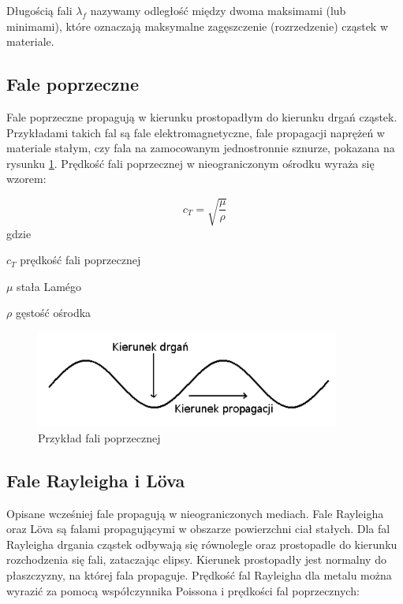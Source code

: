 Długością fali \( \lambda_f \) nazywamy odległość między dwoma maksimami (lub minimami), które oznaczają maksymalne zagęszczenie (rozrzedzenie) cząstek w materiale.

\subsection{Fale poprzeczne}

Fale poprzeczne propagują w kierunku prostopadłym do kierunku drgań cząstek. Przykładami takich fal są fale elektromagnetyczne, fale propagacji naprężeń w materiale stałym, czy fala na zamocowanym jednostronnie sznurze, pokazana na rysunku \ref{fig:fala_poprzeczna}. Prędkość fali poprzecznej w nieograniczonym ośrodku wyraża się wzorem:

\begin{equation}
c_T=\sqrt{\frac{\mu}{\rho}}
\end{equation}
gdzie
\begin{eqwhere}[2cm]
        \item[$c_T$] prędkość fali poprzecznej
        \item[$\mu$] stała Lam\'{e}go
        \item[$\rho$] gęstość ośrodka
\end{eqwhere}

\begin{figure}[h]
\centering
\includegraphics[width=10cm]{Zdjecia/2/fala_poprzeczna3}
\caption{Przykład fali poprzecznej}
\label{fig:fala_poprzeczna}
\end{figure}

\subsection{Fale Rayleigha i L\"{o}va}

Opisane wcześniej fale propagują w nieograniczonych mediach. Fale Rayleigha oraz L\"{o}va są falami propagującymi w obszarze powierzchni ciał stałych. Dla fal Rayleigha drgania cząstek odbywają się równolegle oraz prostopadle do kierunku rozchodzenia się fali, zataczając elipsy. Kierunek prostopadły jest normalny do płaszczyzny, na której fala propaguje. Prędkość fal Rayleigha dla metalu można wyrazić za pomocą współczynnika Poissona i prędkości fal poprzecznych:


